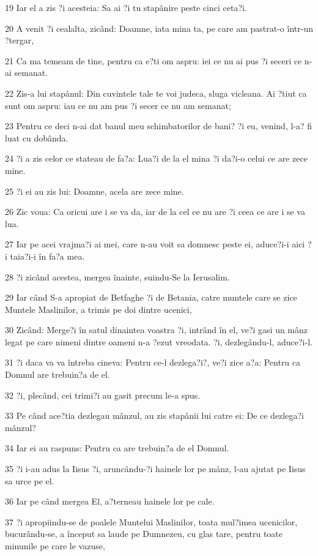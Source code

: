 \par 19 Iar el a zis ?i acesteia: Sa ai ?i tu stapânire peste cinci ceta?i.
\par 20 A venit ?i cealalta, zicând: Doamne, iata mina ta, pe care am pastrat-o într-un ?tergar,
\par 21 Ca ma temeam de tine, pentru ca e?ti om aspru: iei ce nu ai pus ?i seceri ce n-ai semanat.
\par 22 Zis-a lui stapânul: Din cuvintele tale te voi judeca, sluga vicleana. Ai ?tiut ca sunt om aspru: iau ce nu am pus ?i secer ce nu am semanat;
\par 23 Pentru ce deci n-ai dat banul meu schimbatorilor de bani? ?i eu, venind, l-a? fi luat cu dobânda.
\par 24 ?i a zis celor ce stateau de fa?a: Lua?i de la el mina ?i da?i-o celui ce are zece mine.
\par 25 ?i ei au zis lui: Doamne, acela are zece mine.
\par 26 Zic voua: Ca oricui are i se va da, iar de la cel ce nu are ?i ceea ce are i se va lua.
\par 27 Iar pe acei vrajma?i ai mei, care n-au voit sa domnesc peste ei, aduce?i-i aici ?i taia?i-i în fa?a mea.
\par 28 ?i zicând acestea, mergea înainte, suindu-Se la Ierusalim.
\par 29 Iar când S-a apropiat de Betfaghe ?i de Betania, catre muntele care se zice Muntele Maslinilor, a trimis pe doi dintre ucenici,
\par 30 Zicând: Merge?i în satul dinaintea voastra ?i, intrând în el, ve?i gasi un mânz legat pe care nimeni dintre oameni n-a ?ezut vreodata. ?i, dezlegându-l, aduce?i-l.
\par 31 ?i daca va va întreba cineva: Pentru ce-l dezlega?i?, ve?i zice a?a: Pentru ca Domnul are trebuin?a de el.
\par 32 ?i, plecând, cei trimi?i au gasit precum le-a spus.
\par 33 Pe când ace?tia dezlegau mânzul, au zis stapânii lui catre ei: De ce dezlega?i mânzul?
\par 34 Iar ei au raspuns: Pentru ca are trebuin?a de el Domnul.
\par 35 ?i i-au adus la Iisus ?i, aruncându-?i hainele lor pe mânz, l-au ajutat pe Iisus sa urce pe el.
\par 36 Iar pe când mergea El, a?terneau hainele lor pe cale.
\par 37 ?i apropiindu-se de poalele Muntelui Maslinilor, toata mul?imea ucenicilor, bucurându-se, a început sa laude pe Dumnezeu, cu glas tare, pentru toate minunile pe care le vazuse,
